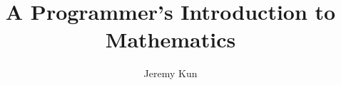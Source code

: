 \documentclass[11pt]{memoir}
\title{A Programmer's Introduction to Mathematics}
\author{Jeremy Kun}
\begin{document}

\newpage

\newpage

\begin{KeepFromToc}
\tableofcontents
\end{KeepFromToc}
{}
\setcounter{page}{0}



\newpage

\printindex
\end{document}
